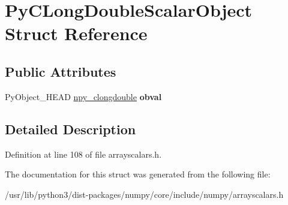 \hypertarget{structPyCLongDoubleScalarObject}{}\section{Py\+C\+Long\+Double\+Scalar\+Object Struct Reference}
\label{structPyCLongDoubleScalarObject}
\subsection*{Public Attributes}
\begin{DoxyCompactItemize}
\item 
Py\+Object\+\_\+\+H\+E\+AD \hyperlink{structnpy__clongdouble}{npy\+\_\+clongdouble} {\bfseries obval}\hypertarget{structPyCLongDoubleScalarObject_a91bc86b790e256fc93c1dcfb241fbf43}{}\label{structPyCLongDoubleScalarObject_a91bc86b790e256fc93c1dcfb241fbf43}

\end{DoxyCompactItemize}


\subsection{Detailed Description}


Definition at line 108 of file arrayscalars.\+h.



The documentation for this struct was generated from the following file\+:\begin{DoxyCompactItemize}
\item 
/usr/lib/python3/dist-\/packages/numpy/core/include/numpy/arrayscalars.\+h\end{DoxyCompactItemize}
